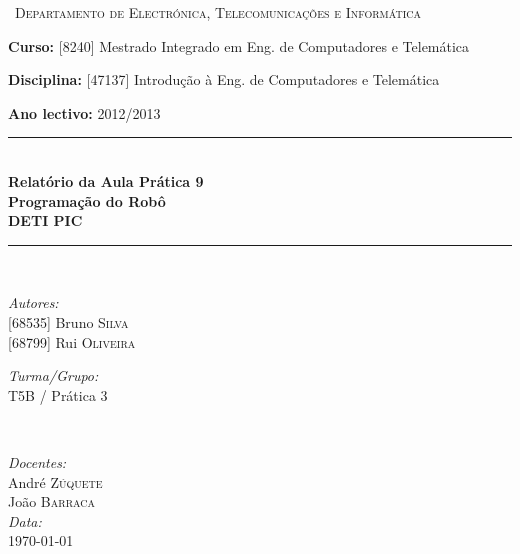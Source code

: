 \documentclass[a4paper, 12pt, onecolumn, oneside]{report}
\begin{document}
\begin{titlepage}

\newcommand{\HRule}{\rule{\linewidth}{0.4mm}} %

\center 


\begin{figure}[H] 
\center{\texttt{[image: UA1]}}
\end{figure}


\textsc{\ Departamento de Electrónica, Telecomunicações e Informática
 }\\[0.9cm] 

{\raggedright \textbf{Curso:} [8240] Mestrado Integrado em Eng. de Computadores e Telemática

\textbf{Disciplina:} [47137] Introdução à Eng. de Computadores e Telemática

\textbf{Ano lectivo:} 2012/2013 \\[1cm] 

}


\HRule \\[0.1cm]
{ \huge \bfseries Relatório da Aula Prática 9 \\
[0.4cm]  
Programação do Robô \\ [0.4cm] DETI PIC }\\[0.4cm] 
\HRule \\[1cm]


\begin{minipage}{0.4\textwidth} 
\begin{flushleft} \large
\emph{Autores:}\\
{[68535] Bruno \textsc{Silva}} \\
{[68799] Rui \textsc{Oliveira} } 


\emph{Turma/Grupo:}\\
T5B / Prática 3\\

\end{flushleft}
\end{minipage}
~
\begin{minipage}{0.4\textwidth}
\begin{flushright} \large
\emph{Docentes:} \\
André \textsc{Zúquete} \\
João \textsc{Barraca} \\
\emph{Data:} \\
\today 
\end{flushright}
\end{minipage}\\[2cm]



\vfill 

\end{titlepage}
\end{document}
